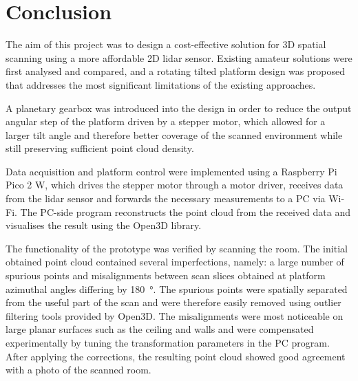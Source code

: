 \chapter{Conclusion}
The aim of this project was to design a cost-effective solution for 3D spatial scanning using a more affordable 2D \gls{lidar} sensor.
Existing amateur solutions were first analysed and compared, and a rotating tilted platform design was proposed that addresses the most significant limitations of the existing approaches.

A planetary gearbox was introduced into the design in order to reduce the output angular step of the platform driven by a stepper motor, which allowed for a larger tilt angle and therefore better coverage of the scanned environment while still preserving sufficient point cloud density.

Data acquisition and platform control were implemented using a Raspberry Pi Pico 2 W, which drives the stepper motor through a motor driver, receives data from the \gls{lidar} sensor and forwards the necessary measurements to a PC via Wi-Fi.
The PC-side program reconstructs the point cloud from the received data and visualises the result using the Open3D library.

The functionality of the prototype was verified by scanning the room.
The initial obtained point cloud contained several imperfections, namely: a large number of spurious points and misalignments between scan slices obtained at platform azimuthal angles differing by \SI{180}{\degree}.
The spurious points were spatially separated from the useful part of the scan and were therefore easily removed using outlier filtering tools provided by Open3D.
The misalignments were most noticeable on large planar surfaces such as the ceiling and walls and were compensated experimentally by tuning the transformation parameters in the PC program.
After applying the corrections, the resulting point cloud showed good agreement with a photo of the scanned room.

